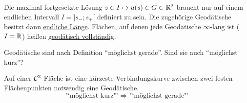 \begin{bemerkung}
 Die maximal fortgesetzte Lösung  \(s \in I \mapsto u(s) \in G \subset \mathbb{R}^2\) braucht nur auf einem endlichen Intervall \(I = ]s_{-}; s_{+}[\) definiert zu sein. Die zugehörige Geodätische besitzt dann \uline{endliche Länge}. Flächen, auf denen jede Geodätische \(\infty\)-lang ist (\(I = \mathbb{R}\)) heißen \uline{geodätisch vollständig}.
\end{bemerkung}

Geodätische sind nach Definition "`möglichst gerade"'. Sind sie auch "`möglichst kurz"'?

\begin{satz}\label{satz223}
 Auf einer \(\mathcal{C}^2\)-Fläche ist eine kürzeste Verbindungskurve zwischen zwei festen Flächenpunkten notwendig eine Geodätische.
 \[
  \text{"`möglichst kurz"' } \Rightarrow \text{ "`möglichst gerade"'}
 \]
\end{satz}


